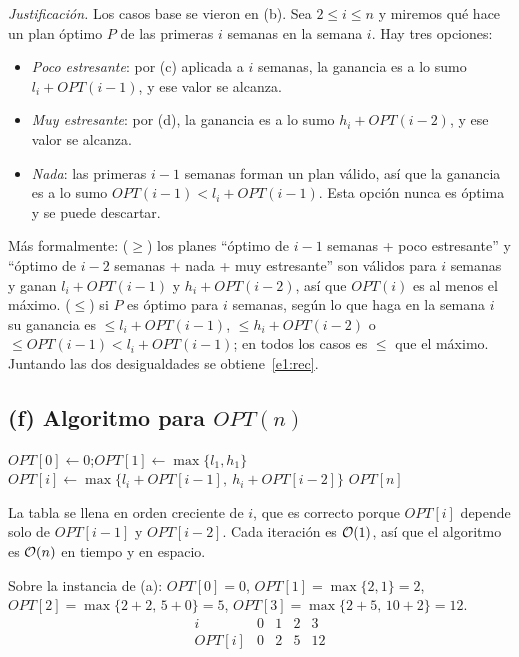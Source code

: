 \emph{Justificación.} Los casos base se vieron en (b). Sea $2\le i\le n$ y miremos qué hace un plan óptimo $P$ de las primeras $i$ semanas en la semana $i$. Hay tres opciones:
\begin{itemize}
\item \emph{Poco estresante}: por (c) aplicada a $i$ semanas, la ganancia es a lo sumo $l_i+OPT(i-1)$, y ese valor se alcanza.
\item \emph{Muy estresante}: por (d), la ganancia es a lo sumo $h_i+OPT(i-2)$, y ese valor se alcanza.
\item \emph{Nada}: las primeras $i-1$ semanas forman un plan válido, así que la ganancia es a lo sumo $OPT(i-1) < l_i+OPT(i-1)$. Esta opción nunca es óptima y se puede descartar.
\end{itemize}
Más formalmente:
($\ge$) los planes ``óptimo de $i-1$ semanas + poco estresante'' y ``óptimo de $i-2$ semanas + nada + muy estresante'' son válidos para $i$ semanas y ganan $l_i+OPT(i-1)$ y $h_i+OPT(i-2)$, así que $OPT(i)$ es al menos el máximo.
($\le$) si $P$ es óptimo para $i$ semanas, según lo que haga en la semana $i$ su ganancia es $\le l_i+OPT(i-1)$, $\le h_i+OPT(i-2)$ o $\le OPT(i-1)<l_i+OPT(i-1)$; en todos los casos es $\le$ que el máximo.
Juntando las dos desigualdades se obtiene~\eqref{e1:rec}.

\subsection*{(f) Algoritmo para $OPT(n)$}

\begin{algorithm}[H]
\caption{Ganancia máxima}
\begin{algorithmic}[1]
  \State $OPT[0]\gets 0$;\quad $OPT[1]\gets \max\{l_1,h_1\}$
    \State $OPT[i]\gets \max\{l_i+OPT[i-1],\ h_i+OPT[i-2]\}$
  \EndFor
  \State \Return $OPT[n]$
\EndFunction
\end{algorithmic}
\end{algorithm}

La tabla se llena en orden creciente de $i$, que es correcto porque $OPT[i]$ depende solo de $OPT[i-1]$ y $OPT[i-2]$. Cada iteración es $\mathcal{O}(1)$, así que el algoritmo es $\mathcal{O}(n)$ en tiempo y en espacio.

Sobre la instancia de (a): $OPT[0]=0$, $OPT[1]=\max\{2,1\}=2$, $OPT[2]=\max\{2+2,\,5+0\}=5$, $OPT[3]=\max\{2+5,\,10+2\}=12$.
\[
\begin{array}{c|cccc}
i & 0 & 1 & 2 & 3\\\hline
OPT[i] & 0 & 2 & 5 & 12
\end{array}
\]


